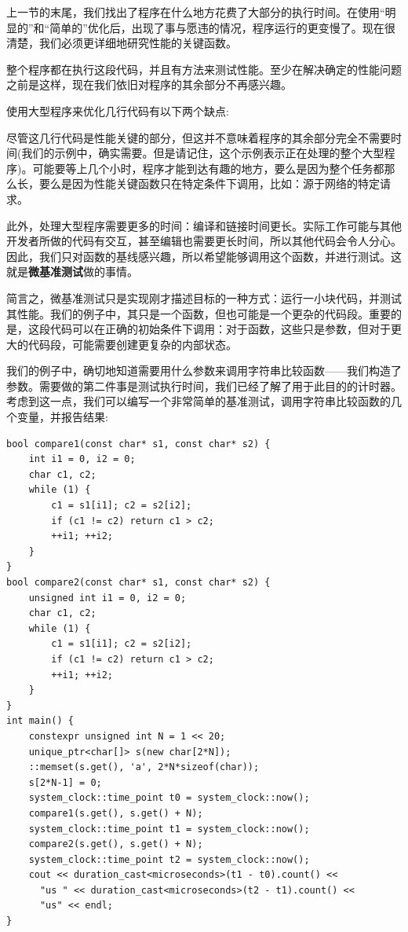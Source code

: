 
上一节的末尾，我们找出了程序在什么地方花费了大部分的执行时间。在使用“明显的”和“简单的”优化后，出现了事与愿违的情况，程序运行的更变慢了。现在很清楚，我们必须更详细地研究性能的关键函数。

整个程序都在执行这段代码，并且有方法来测试性能。至少在解决确定的性能问题之前是这样，现在我们依旧对程序的其余部分不再感兴趣。

使用大型程序来优化几行代码有以下两个缺点:

尽管这几行代码是性能关键的部分，但这并不意味着程序的其余部分完全不需要时间(我们的示例中，确实需要。但是请记住，这个示例表示正在处理的整个大型程序)。可能要等上几个小时，程序才能到达有趣的地方，要么是因为整个任务都那么长，要么是因为性能关键函数只在特定条件下调用，比如：源于网络的特定请求。

此外，处理大型程序需要更多的时间：编译和链接时间更长。实际工作可能与其他开发者所做的代码有交互，甚至编辑也需要更长时间，所以其他代码会令人分心。因此，我们只对函数的基线感兴趣，所以希望能够调用这个函数，并进行测试。这就是\textbf{微基准测试}做的事情。


简言之，微基准测试只是实现刚才描述目标的一种方式：运行一小块代码，并测试其性能。我们的例子中，其只是一个函数，但也可能是一个更杂的代码段。重要的是，这段代码可以在正确的初始条件下调用：对于函数，这些只是参数，但对于更大的代码段，可能需要创建更复杂的内部状态。

我们的例子中，确切地知道需要用什么参数来调用字符串比较函数——我们构造了参数。需要做的第二件事是测试执行时间，我们已经了解了用于此目的的计时器。考虑到这一点，我们可以编写一个非常简单的基准测试，调用字符串比较函数的几个变量，并报告结果:

\begin{lstlisting}[style=styleCXX]
bool compare1(const char* s1, const char* s2) {
	int i1 = 0, i2 = 0;
	char c1, c2;
	while (1) {
		c1 = s1[i1]; c2 = s2[i2];
		if (c1 != c2) return c1 > c2;
		++i1; ++i2;
	}
}
bool compare2(const char* s1, const char* s2) {
	unsigned int i1 = 0, i2 = 0;
	char c1, c2;
	while (1) {
		c1 = s1[i1]; c2 = s2[i2];
		if (c1 != c2) return c1 > c2;
		++i1; ++i2;
	}
}
int main() {
	constexpr unsigned int N = 1 << 20;
	unique_ptr<char[]> s(new char[2*N]);
	::memset(s.get(), 'a', 2*N*sizeof(char));
	s[2*N-1] = 0;
	system_clock::time_point t0 = system_clock::now();
	compare1(s.get(), s.get() + N);
	system_clock::time_point t1 = system_clock::now();
	compare2(s.get(), s.get() + N);
	system_clock::time_point t2 = system_clock::now();
	cout << duration_cast<microseconds>(t1 - t0).count() <<
	  "us " << duration_cast<microseconds>(t2 - t1).count() <<
	  "us" << endl;
}
\end{lstlisting}

